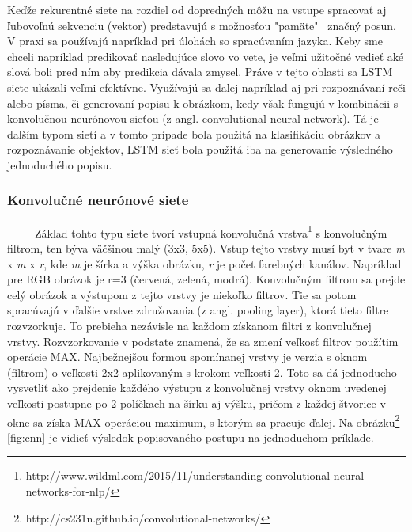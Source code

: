 Keďže rekurentné siete na rozdiel od dopredných môžu na vstupe spracovať aj ľubovoľnú sekvenciu (vektor) predstavujú s možnosťou "pamäte" \ značný posun. V praxi sa používajú napríklad pri úlohách so spracúvaním jazyka. Keby sme chceli napríklad predikovať nasledujúce slovo vo vete, je veľmi užitočné vedieť aké slová boli pred ním aby predikcia dávala zmysel. Práve v tejto oblasti sa LSTM siete ukázali veľmi efektívne. Využívajú sa ďalej napríklad aj pri rozpoznávaní reči\cite{rnn_speech} alebo písma\cite{rnn_handwriting}, či generovaní popisu k obrázkom\cite{image_description}, kedy však fungujú v kombinácii s konvolučnou neurónovou sieťou (z angl. convolutional neural network). Tá je ďalším typom sietí a v tomto prípade bola použitá na klasifikáciu obrázkov a rozpoznávanie objektov, LSTM sieť bola použitá iba na generovanie výsledného jednoduchého popisu.


\subsubsection{Konvolučné neurónové siete}
\
\
\
\
\
Základ tohto typu siete tvorí vstupná konvolučná vrstva\footnote{http://www.wildml.com/2015/11/understanding-convolutional-neural-networks-for-nlp/} s konvolučným filtrom, ten býva väčšinou malý (3x3, 5x5). Vstup tejto vrstvy musí byť v tvare \textit{m} x \textit{m} x \textit{r}, kde \textit{m} je šírka a výška obrázku, \textit{r} je počet farebných kanálov. Napríklad pre RGB obrázok je r=3 (červená, zelená, modrá). Konvolučným filtrom sa prejde celý obrázok a výstupom z tejto vrstvy je niekoľko filtrov. Tie sa potom spracúvajú v ďalšie vrstve združovania (z angl. pooling layer\cite{cs231n}), ktorá tieto filtre rozvzorkuje. To prebieha nezávisle na každom získanom filtri z konvolučnej vrstvy. Rozvzorkovanie v podstate znamená, že sa zmení veľkosť filtrov použítim operácie MAX. Najbežnejšou formou spomínanej vrstvy je verzia s oknom (filtrom) o veľkosti 2x2 aplikovaným s krokom veľkosti 2. Toto sa dá jednoducho vysvetliť ako prejdenie každého výstupu z konvolučnej vrstvy oknom uvedenej veľkosti postupne po 2 políčkach na šírku aj výšku, pričom z každej štvorice v okne sa získa MAX operáciou maximum, s ktorým sa pracuje ďalej. Na  obrázku\footnote{http://cs231n.github.io/convolutional-networks/} \ref{fig:cnn} je vidieť výsledok popisovaného postupu na jednoduchom príklade.
	
